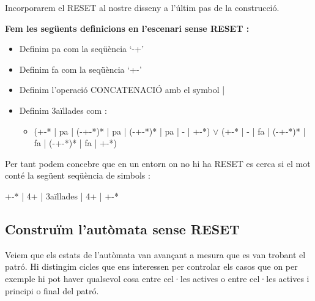 \documentclass[12pt,a4paper]{report}
\begin{document}
Incorporarem el RESET al nostre disseny a l’últim pas de la construcció.

\textbf{Fem les següents definicions en l’escenari sense RESET :}

\begin{itemize}
\item Definim pa com la seqüència ‘-+’
\item Definim fa com la seqüència ‘+-’
\item Definim l’operació CONCATENACIÓ amb el symbol |
\item Definim 3aïllades com :
\begin{itemize}
\item ({+-}* | pa | (-{+-}*)* | pa | (-{+-}*)* | pa | - | {+-}*) $\vee$ ({+-}* | - | fa | (-{+-}*)* | fa | (-{+-}*)* | fa | {+-}*)
\end{itemize}
\end{itemize}

Per tant podem concebre que en un entorn on no hi ha RESET es cerca si el mot conté la següent seqüència de simbols :

\begin{center}
{+-}* | 4+ | 3aïllades | 4+ | {+-}*
\end{center}

\subsection{Construïm l’autòmata sense RESET}

Veiem que els estats de l'autòmata van avançant a mesura que es van trobant el patró. Hi distingim cicles que ens interessen per controlar els casos que on per exemple hi pot haver qualsevol cosa entre cel·les actives o entre cel·les actives i principi o final del patró.
\end{document}
